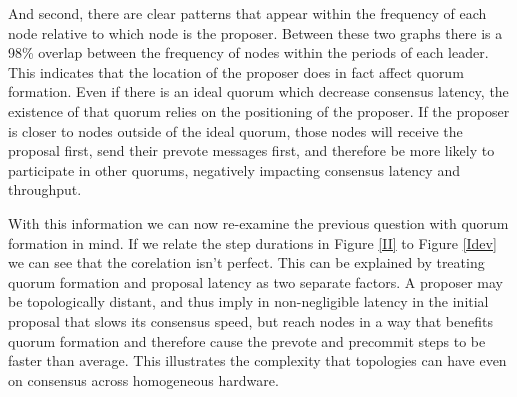 And second, there are clear patterns that appear within the frequency of each node relative to which node is the proposer. Between these two graphs there is a 98\% overlap between the frequency of nodes within the periods of each leader. This indicates that the location of the proposer does in fact affect quorum formation.
%
%
%
Even if there is an ideal quorum which decrease consensus latency, the existence of that quorum relies on the positioning of the proposer. If the proposer is closer to nodes outside of the ideal quorum, those nodes will receive the proposal first, send their prevote messages first, and therefore be more likely to participate in other quorums, negatively impacting consensus latency and throughput. 

With this information we can now re-examine the previous question with quorum formation in mind. If we relate the step durations in Figure \ref{II} to Figure \ref{Idev} we can see that the corelation isn't perfect. This can be explained by treating quorum formation and proposal latency as two separate factors. A proposer may be topologically distant, and thus imply in non-negligible latency in the initial proposal that slows its consensus speed, but reach nodes in a way that benefits quorum formation and therefore cause the prevote and precommit steps to be faster than average. This illustrates the complexity that topologies can have even on consensus across homogeneous hardware. 


